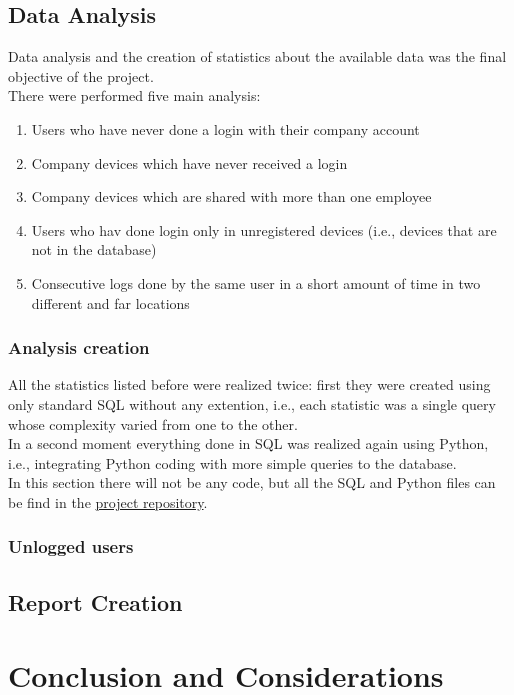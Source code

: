 \documentclass[12pt, a4paper, oneside]{article}
\begin{document}
\subsection{Data Analysis}
Data analysis and the creation of statistics about the available data was the final objective of the project.\\
There were performed five main analysis:
\begin{enumerate}
    \item Users who have never done a login with their company account
    \item Company devices which have never received a login
    \item Company devices which are shared with more than one employee
    \item Users who hav done login only in unregistered devices (i.e., devices that are not in the database)
    \item Consecutive logs done by the same user in a short amount of time in two different and far locations 
\end{enumerate}

\subsubsection{Analysis creation}
All the statistics listed before were realized twice: first they were created using only standard SQL without any extention, i.e., each statistic was a single query whose complexity varied from one to the other.\\
In a second moment everything done in SQL was realized again using Python, i.e., integrating Python coding with more simple queries to the database.\\
In this section there will not be any code, but all the SQL and Python files can be find in the \href{https:\\github.com}{project repository}.

\subsubsection{Unlogged users}







\subsection{Report Creation}
\section{Conclusion and Considerations}
\end{document}
